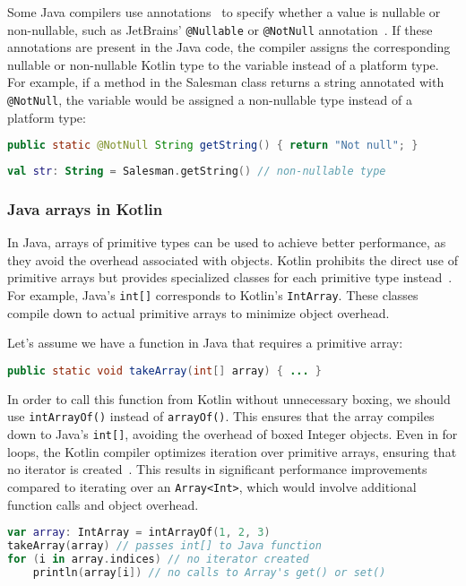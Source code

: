 \documentclass[a4paper,11pt]{article}
\begin{document}
Some Java compilers use annotations~\cite{interop-nullability-annotations} to specify whether a value is nullable or non-nullable, such as JetBrains' \texttt{@Nullable} or \texttt{@NotNull} annotation~\cite{JetBrains-annotations}. If these annotations are present in the Java code, the compiler assigns the corresponding nullable or non-nullable Kotlin type to the variable instead of a platform type. For example, if a method in the Salesman class returns a string annotated with \texttt{@NotNull}, the variable would be assigned a non-nullable type instead of a platform type:
\begin{lstlisting}[language=Java]
public static @NotNull String getString() { return "Not null"; }
\end{lstlisting}
\begin{lstlisting}[language=Kotlin]
val str: String = Salesman.getString() // non-nullable type
\end{lstlisting}

\subsubsection{Java arrays in Kotlin}
In Java, arrays of primitive types can be used to achieve better performance, as they avoid the overhead associated with objects. Kotlin prohibits the direct use of primitive arrays but provides specialized classes for each primitive type instead~\cite{interop-arrays}. For example, Java's \texttt{int[]} corresponds to Kotlin's \texttt{IntArray}. These classes compile down to actual primitive arrays to minimize object overhead.

Let's assume we have a function in Java that requires a primitive array:
\begin{lstlisting}[language=Java]
public static void takeArray(int[] array) { ... }
\end{lstlisting}

In order to call this function from Kotlin without unnecessary boxing, we should use \texttt{intArrayOf()} instead of \texttt{arrayOf()}. This ensures that the array compiles down to Java's \texttt{int[]}, avoiding the overhead of boxed Integer objects. Even in for loops, the Kotlin compiler optimizes iteration over primitive arrays, ensuring that no iterator is created~\cite{interop-arrays}. This results in significant performance improvements compared to iterating over an \texttt{Array<Int>}, which would involve additional function calls and object overhead.

\begin{lstlisting}[language=Kotlin]
var array: IntArray = intArrayOf(1, 2, 3)
takeArray(array) // passes int[] to Java function
for (i in array.indices) // no iterator created
    println(array[i]) // no calls to Array's get() or set()
\end{lstlisting}
\end{document}
